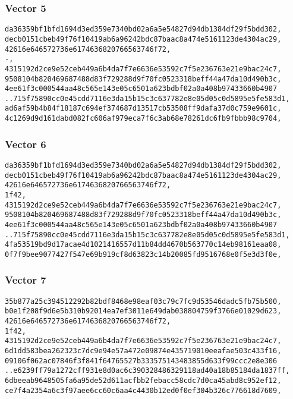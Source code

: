 \documentclass[
]{article}
\begin{document}
\hypertarget{vector-5}{%
\subsubsection{Vector 5}\label{vector-5}}

\begin{verbatim}
da36359bf1bfd1694d3ed359e7340bd02a6a5e54827d94db1384df29f5bdd302,
decb0151cbeb49f76f10419ab6a96242bdc87baac8a474e5161123de4304ac29,
42616e646572736e6174636820766563746f72,
-,
4315192d2ce9e52ceb449a6b4da7f7e6636e53592c7f5e236763e21e9bac24c7,
9508104b820469687488d83f729288d9f70fc0523318beff44a47da10d490b3c,
4ee61f3c000544aa48c565e143e05c6501a623bdbf02a0a408b97433660b4907
..715f75890cc0e45cdd7116e3da15b15c3c637782e8e05d05c0d5895e5fe583d1,
ad6af59b4b84f18187c694ef374687d13517cb53508ff9dafa37d0c759e9601c,
4c1269d9d161dabd082fc606af979eca7f6c3ab68e78261dc6fb9fbbb98c9704,
\end{verbatim}

\hypertarget{vector-6}{%
\subsubsection{Vector 6}\label{vector-6}}

\begin{verbatim}
da36359bf1bfd1694d3ed359e7340bd02a6a5e54827d94db1384df29f5bdd302,
decb0151cbeb49f76f10419ab6a96242bdc87baac8a474e5161123de4304ac29,
42616e646572736e6174636820766563746f72,
1f42,
4315192d2ce9e52ceb449a6b4da7f7e6636e53592c7f5e236763e21e9bac24c7,
9508104b820469687488d83f729288d9f70fc0523318beff44a47da10d490b3c,
4ee61f3c000544aa48c565e143e05c6501a623bdbf02a0a408b97433660b4907
..715f75890cc0e45cdd7116e3da15b15c3c637782e8e05d05c0d5895e5fe583d1,
4fa53519bd9d17acae4d1021416557d11b84dd4670b563770c14eb98161eaa08,
0f7f9bee9077427f547e69b919cf8d63823c14b20085fd9516768e0f5e3d3f0e,
\end{verbatim}

\hypertarget{vector-7}{%
\subsubsection{Vector 7}\label{vector-7}}

\begin{verbatim}
35b877a25c394512292b82bdf8468e98eaf03c79c7fc9d53546dadc5fb75b500,
b0e1f208f9d6e5b310b92014ea7ef3011e649dab038804759f3766e01029d623,
42616e646572736e6174636820766563746f72,
1f42,
4315192d2ce9e52ceb449a6b4da7f7e6636e53592c7f5e236763e21e9bac24c7,
6d1dd583bea262323c7dc9e94e57a472e09874e435719010eeafae503c433f16,
09106f062ac07846f3f841f64765527b333575143483855d633f99ccc2e8e306
..e6239ff79a1272cff931e8d0ac6c390328486329118ad40a18b85184da1837ff,
6dbeeab9648505fa6a95de52d611acfbb2febacc58cdc7d0ca45abd8c952ef12,
ce7f4a2354a6c3f97aee6cc60c6aa4c4430b12ed0f0ef304b326c776618d7609,
\end{verbatim}
\end{document}
